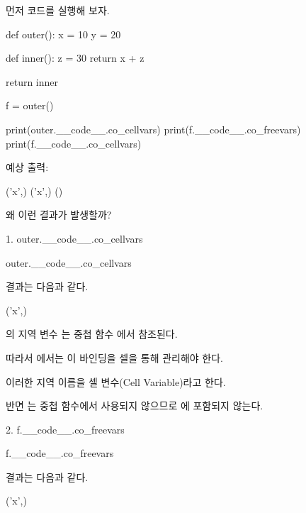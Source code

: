 먼저 코드를 실행해 보자.

\begin{dhkcode}
def outer():
    x = 10
    y = 20

    def inner():
        z = 30
        return x + z

    return inner


f = outer()

print(outer.__code__.co_cellvars)
print(f.__code__.co_freevars)
print(f.__code__.co_cellvars)
\end{dhkcode}

예상 출력:

\begin{dhkzsh}
('x',)
('x',)
()
\end{dhkzsh}

왜 이런 결과가 발생할까?

\begin{dhknote}
\begin{dhksmry}[centered]
1. outer.__code__.co_cellvars
\end{dhksmry}
\end{dhknote}

\begin{dhkcode}
outer.__code__.co_cellvars
\end{dhkcode}

결과는 다음과 같다.

\begin{dhkzsh}
('x',)
\end{dhkzsh}

의 지역 변수 는 중첩 함수 에서 참조된다.

따라서 에서는 이 바인딩을 셀을 통해 관리해야 한다.

이러한 지역 이름을 셀 변수(Cell Variable)라고 한다.

반면 는 중첩 함수에서 사용되지 않으므로 에 포함되지 않는다.

\begin{dhknote}
\begin{dhksmry}[centered]
2. f.__code__.co_freevars
\end{dhksmry}
\end{dhknote}

\begin{dhkcode}
f.__code__.co_freevars
\end{dhkcode}

결과는 다음과 같다.

\begin{dhkzsh}
('x',)
\end{dhkzsh}

